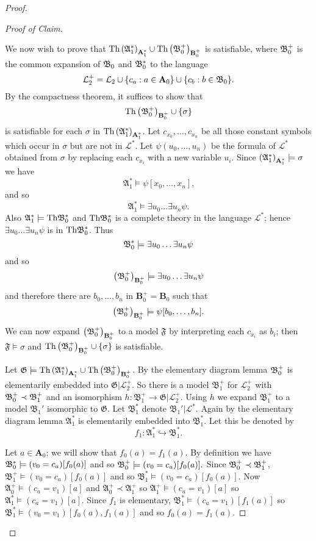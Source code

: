 \documentclass[titlepage, oneside]{amsbook}
\theoremstyle{plain}
\theoremstyle{definition}
\theoremstyle{remark}
\newcommand{\Th}{\ensuremath{\mbox{Th}}}
\newcommand{\lan}{\ensuremath{\mathcal{L}}}
\newcommand{\ma}{\ensuremath{\mathfrak{A}}}
\newcommand{\mb}{\ensuremath{\mathfrak{B}}}
\newcommand{\mf}{\ensuremath{\mathfrak{F}}}
\newcommand{\mg}{\ensuremath{\mathfrak{G}}}
\newcommand{\ba}{\ensuremath{\mathbf{A}}}
\newcommand{\bb}{\ensuremath{\mathbf{B}}}
\newcommand{\exu}[2][0]{\ensuremath{\exists u_{#1}  \dots  \exists   
u_{#2}}}
\newcommand{\bnot}[2][0]{\ensuremath{ b_{#1} , \dots , b_{#2}}}
\newcommand{\unot}[2][0]{\ensuremath{ u_{#1} , \dots , u_{#2}}}
\newcommand{\xnot}[2][0]{\ensuremath{ x_{#1} , \dots , x_{#2}}}
\begin{document}
\begin{proof}
\begin{proof}[Proof of Claim]
$  $\par

We now wish to prove that $\Th \sucks \cup \Th \bobo $ is satisfiable,
where $\bop$ is the common expansion of $\bo$ and $\bostar$ to the
language \[\lan_2^+ = \lan_2 \cup \{ c_a : a \in \ba_0 \} \cup \{ c_b : b
\in \bo \} . \]
By the compactness theorem, it suffices to show that \[ \Th \bobo \cup \{
\sigma \} \] is satisfiable for each $\sigma$ in $\Th \sucks$.  Let
$c_{x_0} , \dots , c_{x_n}$ be all those constant symbols which occur in
$\sigma$ but are not in $\lan^{\ast}$.  Let $\psi ( \unot{n})$ be the
formula of $\lan^{\ast}$ obtained from $\sigma$ by replacing each
$c_{x_i}$ with a new variable $u_i$.  Since $\sucks \models \sigma$ we
have \[\ma_1^{\ast} \models \psi [ \xnot n ] \mbox{,} \]  and so
\[\ma_1^{\ast} \models
\exu n \psi .\]
 Also $\ma_1^{\ast} \models \Th \bostar$ and $\Th
\bostar$
is a complete theory in the language $\lan^{\ast}$; hence $\exu n \psi$ is
in $\Th \bostar$.  Thus \[ \bostar \models \exu n \psi\] and so \[\bobo
\models \exu n \psi\] and therefore there are $\bnot n$ in $\bb_0^+ =
\bb_0$ such that \[\bobo \models \psi [ \bnot n ].\]  
We can now expand $\bobo$ to a model $\mf$ by interpreting each $c_{x_i}$
as $b_i$; then $\mf \models \sigma$ and $\Th \bobo \cup \{ \sigma \}$ is
satisfiable.

Let $\mg \models \Th \sucks \cup \Th \bobo$.  By the elementary diagram
lemma $\bop$ is elementarily embedded into $\mg | {\lan_2^+}$.  So
there is a model $\mb_1^+$ for $\lan_2^+$ with $\bop \prec \mb_1^+$ and an
isomorphism $h: \mb_1^+ \to \mg | {\lan_2^+}$.  Using $h$ we expand
$\mb_1^+$ to a model $\mb_1'$ isomorphic to $\mg$. Let $\mb_1^{\ast}$
denote $\mb_1' | {\lan^{\ast}}$. Again by the elementary diagram lemma
$\ma_1^{\ast}$ is elementarily
embedded into $\mb_1^{\ast}$.  Let this be denoted by \[f_1 : \ma_1^{\ast}
\hookrightarrow \mb_1^{\ast} . \]

\newcommand{\veqc}{\ensuremath{ \models (v_0 = c_a  )[f_0(a)] }}
\newcommand{\ceqv}{\ensuremath{ \models c_a = v_1 [ a ] }}
\newcommand{\veqcb}{\ensuremath{ \models v_0 = c_b [ b ] }}

Let $a \in \ba_0$; we will show that $f_0 (a) = f_1 (a)$.  By
definition we have \\
$ \bostar \models  ( v_0 = c_a ) [ f_0 (a ) ]$
and so $\bop \models (v_0 = c_a ) [f_0 (a) ] . $
Since $ \bop \prec \mb_1^+$, \\
 $ \mb_1^+  \models ( v_0 = c_a ) [ f_0 (a )]$ and so $ \mb_1^{\ast}
\models  (v_0 = c_a ) [ f_0 (a )] .$ Now  $ \ma_0^+ \models (c_a =
v_1)[a]$ and $ \ma_0^+ \prec \ma_1^+ $ so $\ma_1^+ \models (c_a = v_1 )
[a] $
so $ \ma_1^{\ast} \models  (c_a = v_1 ) [a]. $ Since $ f_1 $ is
elementary, 
$\mb_1^{\ast} \models (c_a = v_1) [ f_1 (a) ] $
so $\mb_1^{\ast} \models (v_0 = v_1) [ f_0 (a ), f_1 (a ) ] $
and so $ f_0 (a) = f_1 (a) $. 


\end{proof}
\end{proof}
\end{document}
